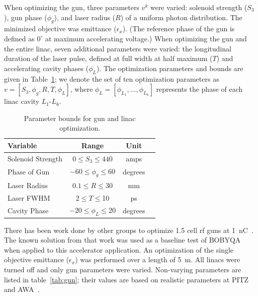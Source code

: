 When optimizing the gun, three parameters $v^k$ were varied: 
solenoid strength ($S_3$), gun phase ($\phi_g$), 
and laser radius ($R$) of a uniform photon distribution. 
The minimized objective was emittance ($\epsilon_x$).
(The reference phase of the gun is defined as $0^{\circ}$ at maximum accelerating voltage.) 
When optimizing the gun and the entire linac, seven additional parameters were 
varied: the longitudinal duration of the laser pulse, defined at full width at half maximum ($T$)
and accelerating cavity phases ($\phi_L$). The optimization parameters and
bounds are given in Table~\ref{tab:parameters}; we denote the set of
ten optimization parameters as $v=[S_3, \phi_g, R, T, \phi_L]$, where 
$\phi_L=[\phi_{L_1},\ldots,\phi_{L_6}]$ represents the phase of each linac cavity $L_1$-$L_6$. 
\begin{table}
	\caption{\label{tab:parameters} Parameter bounds for gun and linac optimization.}
	\begin{center}
		\begin{tabular}{ l *{3}{c}} 
			\toprule
			\textbf{Variable} & \textbf{Range} & \textbf{Unit} \\
			\midrule
			Solenoid Strength & $ 0 \le S_3 \le 440$  & amps \\
			Phase of Gun & $-60 \le \phi_g \le 60$  & degrees \\
			Laser Radius  & $0.1 \le R \le 30$  & mm \\
			Laser FWHM & $2 \le T \le $10  & ps \\
			Cavity Phase  & $-20 \le \phi_L \le 20$  & degrees \\
			\bottomrule	
		\end{tabular}
	\end{center}
\end{table}


 \label{sec:gunbobyqa}
There has been work done by other groups to optimize 1.5 cell rf guns
at \SI{1}{nC}~\cite{pitz}. The known solution from that work was used as 
a baseline test of BOBYQA when applied to this accelerator application.
An optimization of the single objective emittance ($\epsilon_x$) was 
performed over a length of \SI{5}{m}. 
All linacs were turned off and only gun parameters were varied. 
Non-varying parameters are listed in table~\ref{tab:gun}; 
their values are based on realistic parameters at PITZ and AWA~\cite{pitz, benchmark}.

